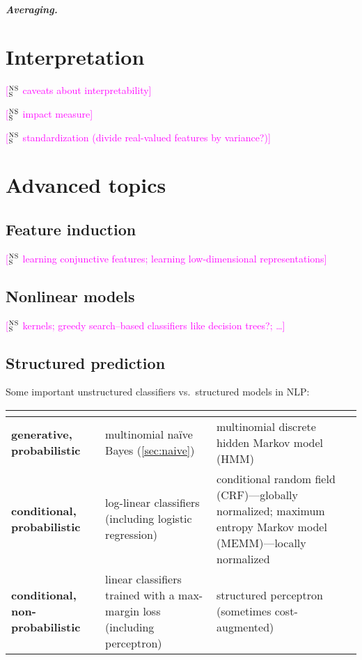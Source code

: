 \documentclass[11pt,letterpaper]{article}
\newcommand{\ensuretext}[1]{#1}
\newcommand{\nssmarker}{\ensuretext{\textcolor{magenta}{\ensuremath{^{\textsc{NS}}_{\textsc{S}}}}}}
\newcommand{\arkcomment}[3]{\ensuretext{\textcolor{#3}{[#1 #2]}}}
\newcommand{\nss}[1]{\arkcomment{\nssmarker}{#1}{magenta}}
\begin{document}
\subparagraph{Averaging.}






\section{Interpretation}\label{sec:interp}

\nss{caveats about interpretability}

\nss{impact measure}

\nss{standardization (divide real-valued features by variance?)}

\section{Advanced topics}

\subsection{Feature induction}\label{sec:induction}

\nss{learning conjunctive features; learning low-dimensional representations}

\subsection{Nonlinear models}

\nss{kernels; greedy search--based classifiers like decision trees?; \ldots}

\subsection{Structured prediction}

Some important unstructured classifiers vs.~structured models in NLP:

\begin{center}\small
\begin{tabular}{@{}>{\raggedright\bf}p{9em}>{\raggedright}p{13em}@{~~}>{\raggedright\arraybackslash}p{16em}@{}}
& \multicolumn{1}{c}{Unstructured} & \multicolumn{1}{c}{Sequence} \\
\hline
generative, probabilistic & multinomial na\"{i}ve Bayes (\cref{sec:naive}) & {\raggedright multinomial discrete hidden Markov model (HMM)} \\
\hline
conditional, probabilistic & log-linear classifiers (including logistic regression) & conditional random field (CRF)---globally normalized; 
maximum entropy Markov model (MEMM)---locally normalized \\
\hline
conditional, non-probabilistic & linear classifiers trained with a max-margin loss (including perceptron) & structured perceptron \citep{collins-02} (sometimes cost-augmented) \\
\hline
\end{tabular}
\end{center}
\end{document}
